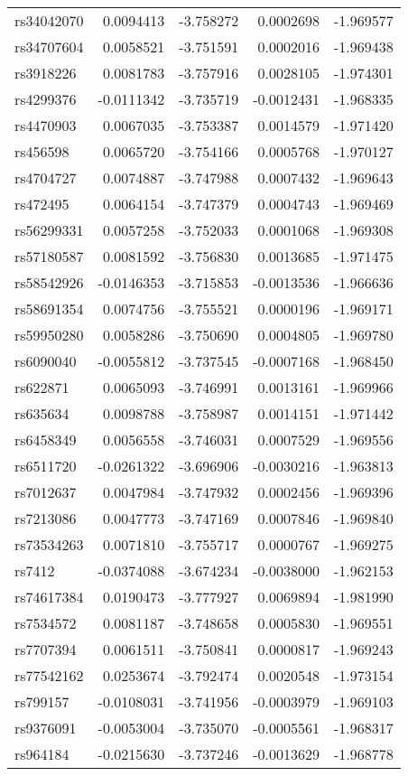\documentclass[AMA,STIX1COL,]{WileyNJD-v2}
\begin{document}
\begin{longtable}[t]{lrrrr}
\addlinespace
rs34042070 & 0.0094413 & -3.758272 & 0.0002698 & -1.969577\\
rs34707604 & 0.0058521 & -3.751591 & 0.0002016 & -1.969438\\
rs3918226 & 0.0081783 & -3.757916 & 0.0028105 & -1.974301\\
rs4299376 & -0.0111342 & -3.735719 & -0.0012431 & -1.968335\\
rs4470903 & 0.0067035 & -3.753387 & 0.0014579 & -1.971420\\
\addlinespace
rs456598 & 0.0065720 & -3.754166 & 0.0005768 & -1.970127\\
rs4704727 & 0.0074887 & -3.747988 & 0.0007432 & -1.969643\\
rs472495 & 0.0064154 & -3.747379 & 0.0004743 & -1.969469\\
rs56299331 & 0.0057258 & -3.752033 & 0.0001068 & -1.969308\\
rs57180587 & 0.0081592 & -3.756830 & 0.0013685 & -1.971475\\
\addlinespace
rs58542926 & -0.0146353 & -3.715853 & -0.0013536 & -1.966636\\
rs58691354 & 0.0074756 & -3.755521 & 0.0000196 & -1.969171\\
rs59950280 & 0.0058286 & -3.750690 & 0.0004805 & -1.969780\\
rs6090040 & -0.0055812 & -3.737545 & -0.0007168 & -1.968450\\
rs622871 & 0.0065093 & -3.746991 & 0.0013161 & -1.969966\\
\addlinespace
rs635634 & 0.0098788 & -3.758987 & 0.0014151 & -1.971442\\
rs6458349 & 0.0056558 & -3.746031 & 0.0007529 & -1.969556\\
rs6511720 & -0.0261322 & -3.696906 & -0.0030216 & -1.963813\\
rs7012637 & 0.0047984 & -3.747932 & 0.0002456 & -1.969396\\
rs7213086 & 0.0047773 & -3.747169 & 0.0007846 & -1.969840\\
\addlinespace
rs73534263 & 0.0071810 & -3.755717 & 0.0000767 & -1.969275\\
rs7412 & -0.0374088 & -3.674234 & -0.0038000 & -1.962153\\
rs74617384 & 0.0190473 & -3.777927 & 0.0069894 & -1.981990\\
rs7534572 & 0.0081187 & -3.748658 & 0.0005830 & -1.969551\\
rs7707394 & 0.0061511 & -3.750841 & 0.0000817 & -1.969243\\
\addlinespace
rs77542162 & 0.0253674 & -3.792474 & 0.0020548 & -1.973154\\
rs799157 & -0.0108031 & -3.741956 & -0.0003979 & -1.969103\\
rs9376091 & -0.0053004 & -3.735070 & -0.0005561 & -1.968317\\
rs964184 & -0.0215630 & -3.737246 & -0.0013629 & -1.968778\\*
\end{longtable}
\end{document}
